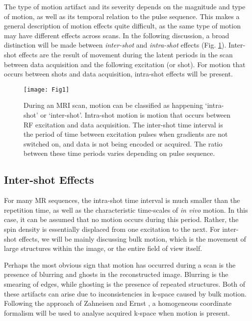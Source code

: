 \documentclass[class=article, crop=false]{standalone}
\begin{document}
The type of motion artifact and its severity depends on the magnitude and type of motion, as well as its temporal relation to the pulse sequence. This makes a general description of motion effects quite difficult, as the same type of motion may have different effects across scans. In the following discussion, a broad distinction will be made between \textit{inter-shot} and \textit{intra-shot} effects (Fig. \ref{fig:fig1}). Inter-shot effects are the result of movement during the latent periods in the scan between data acquisition and the following excitation (or shot). For motion that occurs between shots and data acquisition, intra-shot effects will be present.

\begin{figure}[h]
	\texttt{[image: Fig1]}
	\centering
	\caption{During an MRI scan, motion can be classified as happening `intra-shot' or `inter-shot'. Intra-shot motion is motion that occurs between RF excitation and data acquisition. The inter-shot time interval is the period of time between excitation pulses when gradients are not switched on, and data is not being encoded or acquired. The ratio between these time periods varies depending on pulse sequence.}
	\label{fig:fig1}
\end{figure}

\subsection{Inter-shot Effects}

For many MR sequences, the intra-shot time interval is much smaller than the repetition time, as well as the characteristic time-scales of \textit{in vivo} motion. In this case, it can be assumed that no motion occurs during this period. Rather, the spin density is essentially displaced from one excitation to the next. For inter-shot effects, we will be mainly discussing bulk motion, which is the movement of large structures within the image, or the entire field of view itself. 
\par
Perhaps the most obvious sign that motion has occurred during a scan is the presence of blurring and ghosts in the reconstructed image. Blurring is the smearing of edges, while ghosting is the presence of repeated structures. Both of these artifacts can arise due to inconsistencies in k-space caused by bulk motion. Following the approach of Zahneisen and Ernst \parencite*{Zahneisen2016}, a homogeneous coordinate formalism will be used to analyse acquired k-space when motion is present.
\end{document}
